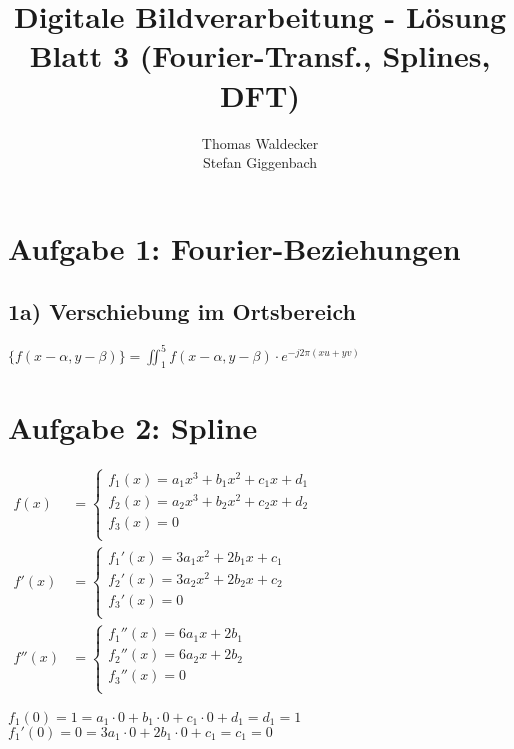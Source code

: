 \documentclass[a4paper,10pt]{scrartcl}
\title{Digitale Bildverarbeitung - Lösung Blatt 3 (Fourier-Transf., Splines, DFT)}
\author{Thomas Waldecker\\
	Stefan Giggenbach}
\begin{document}
\maketitle

\section{Aufgabe 1: Fourier-Beziehungen}
\subsection{1a) Verschiebung im Ortsbereich}

$\{f(x-\alpha,y-\beta)\}=\iint_{1}^{5}{f(x-\alpha,y-\beta)\cdot e^{-j2\pi(xu+yv)}}$

\section{Aufgabe 2: Spline}

\begin{math}
\begin{array}{ll}
f(x) & = 
 \left\{ 
  \begin{array}{l}
   f_1(x) = a_1x^3 + b_1x^2 + c_1x + d_1\\
   f_2(x) = a_2x^3 + b_2x^2 + c_2x + d_2\\
   f_3(x) = 0\\
  \end{array} 
 \right.
\\[0.5cm]
f'(x) & = 
 \left\{ 
  \begin{array}{l}
   f_1'(x) = 3a_1x^2 + 2b_1x + c_1 \\
   f_2'(x) = 3a_2x^2 + 2b_2x + c_2 \\
   f_3'(x) = 0\\
  \end{array} 
 \right.
\\[0.5cm]
f''(x) & = 
 \left\{
  \begin{array}{l}
   f_1''(x) = 6a_1x + 2b_1\\
   f_2''(x) = 6a_2x + 2b_2\\
   f_3''(x) = 0\\
  \end{array}
 \right.
 \end{array}
\end{math}

$f_1(0) = 1 = a_1 \cdot 0 + b_1 \cdot 0 + c_1 \cdot 0 + d_1 = d_1 = 1$\\
$f_1'(0) = 0 = 3a_1 \cdot 0 + 2b_1 \cdot 0 + c_1 = c_1 = 0$\\
\end{document}
